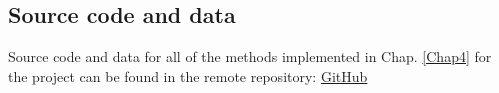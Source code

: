 \documentclass[12pt, a4paper]{report}
\begin{document}
\renewcommand{\bibname}{References}

%

\begin{appendices}
\chapter{Source code and data} \label{Source_Code}
Source code and data for all of the methods implemented in Chap. \ref{Chap4} for the project can be found in the remote repository: \href{https://github.com/rpoandres/MSc_USS_Dissertation}{GitHub}







\end{appendices}
\clearpage
\printglossaries

\end{document}
